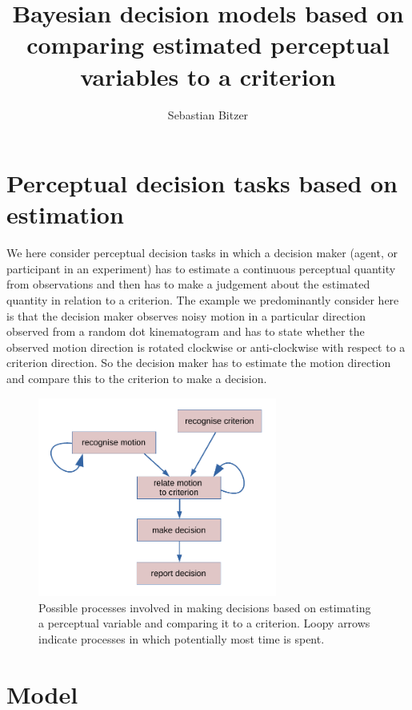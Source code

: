 \documentclass[10pt,a4paper]{article}
\author{Sebastian Bitzer}
\title{Bayesian decision models based on comparing estimated perceptual variables to a criterion}
\begin{document}
\maketitle

\section{Perceptual decision tasks based on estimation}
We here consider perceptual decision tasks in which a decision maker (agent, or participant in an experiment) has to estimate a continuous perceptual quantity from observations and then has to make a judgement about the estimated quantity in relation to a criterion. The example we predominantly consider here is that the decision maker observes noisy motion in a particular direction observed from a random dot kinematogram and has to state whether the observed motion direction is rotated clockwise or anti-clockwise with respect to a criterion direction. So the decision maker has to estimate the motion direction and compare this to the criterion to make a decision.

\begin{figure}[ht]
\centering
\includegraphics[width=0.7\textwidth]{model_diagram}
\caption{Possible processes involved in making decisions based on estimating a perceptual variable and comparing it to a criterion. Loopy arrows indicate processes in which potentially most time is spent.}
\end{figure}

\section{Model}
\end{document}
